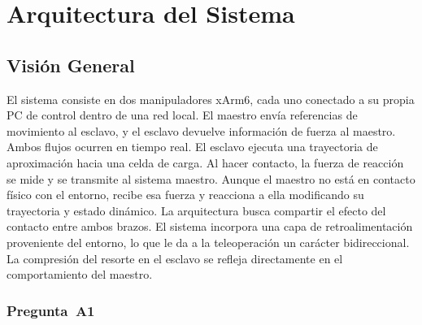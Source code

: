 \documentclass[journal,10pt,twoside]{IEEEtran}
\begin{document}
\section{Arquitectura del Sistema}
\label{sec:architecture}

\subsection{Visión General}
El sistema consiste en dos manipuladores xArm6, cada uno conectado a su
propia PC de control dentro de una red local. El maestro envía referencias
de movimiento al esclavo, y el esclavo devuelve información de fuerza al
maestro. Ambos flujos ocurren en tiempo real.
El esclavo ejecuta una trayectoria de aproximación hacia una celda de carga.
Al hacer contacto, la fuerza de reacción se mide y se transmite
al sistema maestro. Aunque el maestro no está en contacto físico con el
entorno, recibe esa fuerza y reacciona a ella modificando su trayectoria
y estado dinámico.
La arquitectura busca compartir el efecto del contacto entre ambos brazos.
El sistema incorpora una capa de retroalimentación proveniente del entorno,
lo que le da a la teleoperación un carácter bidireccional. La compresión
del resorte en el esclavo se refleja directamente en el comportamiento
del maestro.

\subsubsection*{Pregunta~A1}
\end{document}
